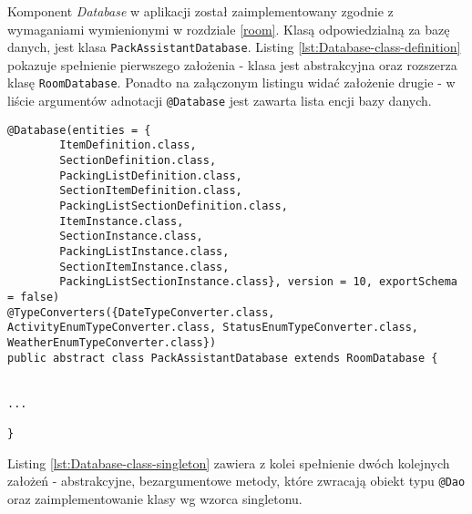\documentclass[a4paper,12pt]{article}
\begin{document}
Komponent \textit{Database} w aplikacji został zaimplementowany zgodnie z wymaganiami wymienionymi w rozdziale \ref{room}.
Klasą odpowiedzialną za bazę danych, jest klasa \texttt{PackAssistantDatabase}. Listing \ref{lst:Database-class-definition} pokazuje spełnienie pierwszego założenia - klasa jest abstrakcyjna oraz rozszerza klasę \texttt{RoomDatabase}. Ponadto na załączonym listingu widać założenie drugie - w liście argumentów adnotacji \texttt{@Database} jest zawarta lista encji bazy danych.

\begin{lstlisting}[caption= Definicja klasy PackAssistantDatabase,label={lst:Database-class-definition}]
@Database(entities = {
        ItemDefinition.class,
        SectionDefinition.class,
        PackingListDefinition.class,
        SectionItemDefinition.class,
        PackingListSectionDefinition.class,
        ItemInstance.class,
        SectionInstance.class,
        PackingListInstance.class,
        SectionItemInstance.class,
        PackingListSectionInstance.class}, version = 10, exportSchema = false)
@TypeConverters({DateTypeConverter.class, ActivityEnumTypeConverter.class, StatusEnumTypeConverter.class, WeatherEnumTypeConverter.class})
public abstract class PackAssistantDatabase extends RoomDatabase {


...

}
\end{lstlisting}

Listing \ref{lst:Database-class-singleton} zawiera z kolei spełnienie dwóch kolejnych założeń - abstrakcyjne, bezargumentowe metody, które zwracają obiekt typu \texttt{@Dao} oraz zaimplementowanie klasy wg wzorca singletonu.
\end{document}
